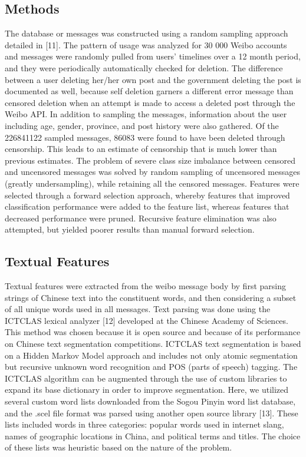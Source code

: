 \documentclass{article} %
\begin{document}
\begin{CJK*}{UTF8}{gbsn}
\section{Methods}
The database or messages was constructed using a random sampling approach detailed in [11]. The pattern of usage was analyzed for 30 000 Weibo accounts and messages were randomly pulled from users' timelines over a 12 month period, and they were periodically automatically checked for deletion. The difference between a user deleting her/her own post and the government deleting the post is documented as well, because self deletion garners a different error message than censored deletion when an attempt is made to access a deleted post through the Weibo API. In addition to sampling the messages, information about the user including age, gender, province, and post history were also gathered. Of the 226841122 sampled messages, 86083 were found to have been deleted through censorship. This leads to an estimate of censorship that is much lower than previous estimates. The problem of severe class size imbalance between censored and uncensored messages was solved by random sampling of uncensored messages (greatly undersampling), while retaining all the censored messages. Features were selected through a forward selection approach, whereby features that improved classification performance were added to the feature list, whereas features that decreased performance were pruned. Recursive feature elimination was also attempted, but yielded poorer results than manual forward selection.

\subsection{Textual Features}
Textual features were extracted from the weibo message body by first parsing strings of Chinese text into the constituent words, and then considering a subset of all unique words used in all messages. Text parsing was done using the ICTCLAS lexical analyzer [12] developed at the Chinese Academy of Sciences. This method was chosen because it is open source and because of its performance on Chinese text segmentation competitions. ICTCLAS text segmentation is based on a Hidden Markov Model approach and includes not only atomic segmentation but recursive unknown word recognition and POS (parts of speech) tagging. The ICTCLAS algorithm can be augmented through the use of custom libraries to expand its base dictionary in order to improve segmentation. Here, we utilized several custom word lists downloaded from the Sogou Pinyin word list database, and the .scel file format was parsed using another open source library [13]. These lists included words in three categories: popular words used in internet slang, names of geographic locations in China, and political terms and titles. The choice of these lists was heuristic based on the nature of the problem. \\


\end{CJK*}
\end{document}
